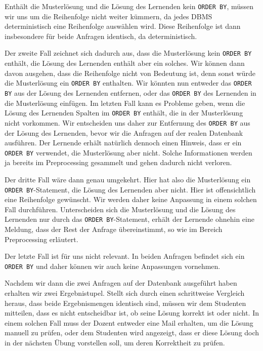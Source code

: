 Enthält die Musterlösung und die Lösung des Lernenden kein \verb|ORDER BY|, müssen wir uns um die Reihenfolge nicht weiter kümmern, da jedes DBMS deterministisch eine Reihenfolge auswählen wird. Diese Reihenfolge ist dann insbesondere für beide Anfragen identisch, da deterministisch.

Der zweite Fall zeichnet sich dadurch aus, dass die Musterlösung kein \verb|ORDER BY| enthält, die Lösung des Lernenden enthält aber ein solches. Wir können dann davon ausgehen, dass die Reihenfolge nicht von Bedeutung ist, denn sonst würde die Musterlösung ein \verb|ORDER BY| enthalten. Wir könnten nun entweder das \verb|ORDER BY| aus der Lösung des Lernenden entfernen, oder das \verb|ORDER BY| des Lernenden in die Musterlösung einfügen. Im letzten Fall kann es Probleme geben, wenn die Lösung des Lernenden Spalten im \verb|ORDER BY| enthält, die in der Musterlösung nicht vorkommen. Wir entscheiden uns daher zur Entfernung des \verb|ORDER BY| aus der Lösung des Lernenden, bevor wir die Anfragen auf der realen Datenbank ausführen. Der Lernende erhält natürlich dennoch einen Hinweis, dass er ein \verb|ORDER BY| verwendet, die Musterlösung aber nicht. Solche Informationen werden ja bereits im Preprocessing gesammelt und gehen dadurch nicht verloren.

Der dritte Fall wäre dann genau umgekehrt. Hier hat also die Musterlösung ein \verb|ORDER BY|-Statement, die Lösung des Lernenden aber nicht. Hier ist offensichtlich eine Reihenfolge gewünscht. Wir werden daher keine Anpassung in einem solchen Fall durchführen. Unterscheiden sich die Musterlösung und die Lösung des Lernenden nur durch das \verb|ORDER BY|-Statement, erhält der Lernende ohnehin eine Meldung, dass der Rest der Anfrage übereinstimmt, so wie im Bereich Preprocessing erläutert.

Der letzte Fall ist für uns nicht relevant. In beiden Anfragen befindet sich ein \verb|ORDER BY| und daher können wir auch keine Anpassungen vornehmen. 

Nachdem wir dann die zwei Anfragen auf der Datenbank ausgeführt haben erhalten wir zwei Ergebnistupel. Stellt sich durch einen schrittweise Vergleich heraus, dass beide Ergebnismengen identisch sind, müssen wir dem Studenten mitteilen, dass es nicht entscheidbar ist, ob seine Lösung korrekt ist oder nicht. In einem solchen Fall muss der Dozent entweder eine Mail erhalten, um die Lösung manuell zu prüfen, oder dem Studenten wird angezeigt, dass er diese Lösung doch in der nächsten Übung vorstellen soll, um deren Korrektheit zu prüfen.

